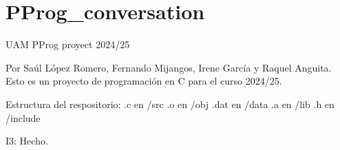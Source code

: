 \chapter{PProg\+\_\+conversation}
\hypertarget{md_README}{}\label{md_README}
\label{md_README_autotoc_md0}%
%
UAM PProg proyect 2024/25

Por Saúl López Romero, Fernando Mijangos, Irene García y Raquel Anguita. Esto es un proyecto de programación en C para el curso 2024/25.

Estructura del respositorio\+: .c en /src .o en /obj .dat en /data .a en /lib .h en /include

I3\+: Hecho. 